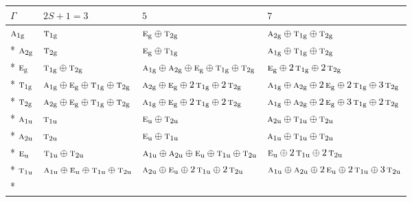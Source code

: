 \documentclass[10pt,a4paper]{article}
\numberwithin{equation}{section}
\newcommand{\irr}[1]{\text{\normalfont\scshape #1}}
\newcommand{\ptag}[1]{\mathrm{#1}}
\begin{document}
{\small\setlength{\tabcolsep}{3pt}\begin{longtable}{@{}llll@{}}\toprule
$\Gamma$ & $2S + 1 = 3$ & $5$ & $7$\\\midrule\endhead
\bottomrule\endfoot\endlastfoot
$\irr{a}_{1\ptag{g}}$ & $\irr{t}_{1\ptag{g}}$ & $\irr{e}_{\ptag{g}}\oplus \irr{t}_{2\ptag{g}}$ & $\irr{a}_{2\ptag{g}}\oplus \irr{t}_{1\ptag{g}}\oplus \irr{t}_{2\ptag{g}}$\\*
$\irr{a}_{2\ptag{g}}$ & $\irr{t}_{2\ptag{g}}$ & $\irr{e}_{\ptag{g}}\oplus \irr{t}_{1\ptag{g}}$ & $\irr{a}_{1\ptag{g}}\oplus \irr{t}_{1\ptag{g}}\oplus \irr{t}_{2\ptag{g}}$\\*
$\irr{e}_{\ptag{g}}$ & $\irr{t}_{1\ptag{g}}\oplus \irr{t}_{2\ptag{g}}$ & $\irr{a}_{1\ptag{g}}\oplus \irr{a}_{2\ptag{g}}\oplus \irr{e}_{\ptag{g}}\oplus \irr{t}_{1\ptag{g}}\oplus \irr{t}_{2\ptag{g}}$ & $\irr{e}_{\ptag{g}}\oplus 2\,\irr{t}_{1\ptag{g}}\oplus 2\,\irr{t}_{2\ptag{g}}$\\*
$\irr{t}_{1\ptag{g}}$ & $\irr{a}_{1\ptag{g}}\oplus \irr{e}_{\ptag{g}}\oplus \irr{t}_{1\ptag{g}}\oplus \irr{t}_{2\ptag{g}}$ & $\irr{a}_{2\ptag{g}}\oplus \irr{e}_{\ptag{g}}\oplus 2\,\irr{t}_{1\ptag{g}}\oplus 2\,\irr{t}_{2\ptag{g}}$ & $\irr{a}_{1\ptag{g}}\oplus \irr{a}_{2\ptag{g}}\oplus 2\,\irr{e}_{\ptag{g}}\oplus 2\,\irr{t}_{1\ptag{g}}\oplus 3\,\irr{t}_{2\ptag{g}}$\\*
$\irr{t}_{2\ptag{g}}$ & $\irr{a}_{2\ptag{g}}\oplus \irr{e}_{\ptag{g}}\oplus \irr{t}_{1\ptag{g}}\oplus \irr{t}_{2\ptag{g}}$ & $\irr{a}_{1\ptag{g}}\oplus \irr{e}_{\ptag{g}}\oplus 2\,\irr{t}_{1\ptag{g}}\oplus 2\,\irr{t}_{2\ptag{g}}$ & $\irr{a}_{1\ptag{g}}\oplus \irr{a}_{2\ptag{g}}\oplus 2\,\irr{e}_{\ptag{g}}\oplus 3\,\irr{t}_{1\ptag{g}}\oplus 2\,\irr{t}_{2\ptag{g}}$\\*
$\irr{a}_{1\ptag{u}}$ & $\irr{t}_{1\ptag{u}}$ & $\irr{e}_{\ptag{u}}\oplus \irr{t}_{2\ptag{u}}$ & $\irr{a}_{2\ptag{u}}\oplus \irr{t}_{1\ptag{u}}\oplus \irr{t}_{2\ptag{u}}$\\*
$\irr{a}_{2\ptag{u}}$ & $\irr{t}_{2\ptag{u}}$ & $\irr{e}_{\ptag{u}}\oplus \irr{t}_{1\ptag{u}}$ & $\irr{a}_{1\ptag{u}}\oplus \irr{t}_{1\ptag{u}}\oplus \irr{t}_{2\ptag{u}}$\\*
$\irr{e}_{\ptag{u}}$ & $\irr{t}_{1\ptag{u}}\oplus \irr{t}_{2\ptag{u}}$ & $\irr{a}_{1\ptag{u}}\oplus \irr{a}_{2\ptag{u}}\oplus \irr{e}_{\ptag{u}}\oplus \irr{t}_{1\ptag{u}}\oplus \irr{t}_{2\ptag{u}}$ & $\irr{e}_{\ptag{u}}\oplus 2\,\irr{t}_{1\ptag{u}}\oplus 2\,\irr{t}_{2\ptag{u}}$\\*
$\irr{t}_{1\ptag{u}}$ & $\irr{a}_{1\ptag{u}}\oplus \irr{e}_{\ptag{u}}\oplus \irr{t}_{1\ptag{u}}\oplus \irr{t}_{2\ptag{u}}$ & $\irr{a}_{2\ptag{u}}\oplus \irr{e}_{\ptag{u}}\oplus 2\,\irr{t}_{1\ptag{u}}\oplus 2\,\irr{t}_{2\ptag{u}}$ & $\irr{a}_{1\ptag{u}}\oplus \irr{a}_{2\ptag{u}}\oplus 2\,\irr{e}_{\ptag{u}}\oplus 2\,\irr{t}_{1\ptag{u}}\oplus 3\,\irr{t}_{2\ptag{u}}$\\*

\end{longtable}}
\end{document}
